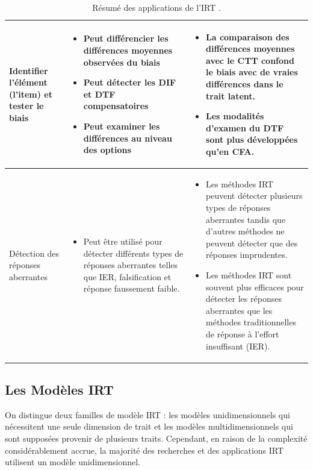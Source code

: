 \begin{table}[H]
\begin{tabular}{|m{4cm}|m{6cm}|m{6cm}|}
	Identifier l'élément (l'item) et tester le biais &
	\begin{itemize}[leftmargin=*]
	    \item Peut différencier les différences moyennes observées du biais
	    \item Peut détecter les DIF et DTF compensatoires
	    \item Peut examiner les différences au niveau des options
	\end{itemize}
	&
	\begin{itemize}[leftmargin=*]
	    \item La comparaison des différences moyennes avec le CTT confond le biais avec de vraies différences dans le trait latent.
	    \item Les modalités d'examen du DTF sont plus développées qu'en CFA.
	\end{itemize}\\ \hline

	Détection des réponses aberrantes &
	\begin{itemize}[leftmargin=*]
	    \item Peut être utilisé pour détecter différents types de réponses aberrantes telles que IER, falsification et réponse faussement faible.
	\end{itemize}
	&
	\begin{itemize}[leftmargin=*]
	    \item Les méthodes IRT peuvent détecter plusieurs types de réponses aberrantes tandis que d'autres méthodes ne peuvent détecter que des réponses imprudentes.
	    \item Les méthodes IRT sont souvent plus efficaces pour détecter les réponses aberrantes que les méthodes traditionnelles de réponse à l'effort insuffisant (IER).
	\end{itemize}\\ \hline
    \end{tabular}
	\caption{Résumé des applications de l'IRT \cite{nye2020advancing}.}
	\label{irt_application}
\end{table}


\subsection{Les Modèles IRT}
On distingue deux familles de modèle IRT : les modèles unidimensionnels qui nécessitent une seule dimension de trait et les modèles multidimensionnels qui sont supposées provenir de plusieurs traits. Cependant, en raison de la complexité considérablement accrue, la majorité des recherches et des applications IRT utilisent un modèle unidimensionnel. \\

